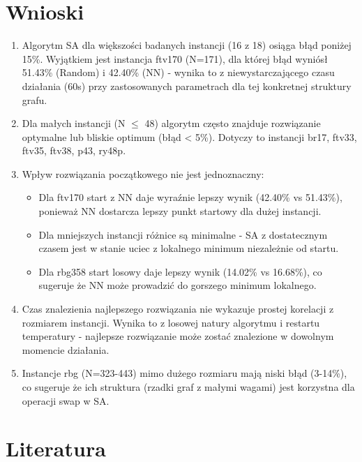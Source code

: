 \documentclass[a4paper,12pt]{article}
\begin{document}
\section{Wnioski}

\begin{enumerate}
    \item Algorytm SA dla większości badanych instancji (16 z 18) osiąga błąd poniżej 15\%. Wyjątkiem jest instancja ftv170 (N=171), dla której błąd wyniósł 51.43\% (Random) i 42.40\% (NN) - wynika to z niewystarczającego czasu działania (60s) przy zastosowanych parametrach dla tej konkretnej struktury grafu.
    
    \item Dla małych instancji (N $\leq$ 48) algorytm często znajduje rozwiązanie optymalne lub bliskie optimum (błąd < 5\%). Dotyczy to instancji br17, ftv33, ftv35, ftv38, p43, ry48p.
    
    \item Wpływ rozwiązania początkowego nie jest jednoznaczny:
    \begin{itemize}
        \item Dla ftv170 start z NN daje wyraźnie lepszy wynik (42.40\% vs 51.43\%), ponieważ NN dostarcza lepszy punkt startowy dla dużej instancji.
        \item Dla mniejszych instancji różnice są minimalne - SA z dostatecznym czasem jest w stanie uciec z lokalnego minimum niezależnie od startu.
        \item Dla rbg358 start losowy daje lepszy wynik (14.02\% vs 16.68\%), co sugeruje że NN może prowadzić do gorszego minimum lokalnego.
    \end{itemize}
    
    \item Czas znalezienia najlepszego rozwiązania nie wykazuje prostej korelacji z rozmiarem instancji. Wynika to z losowej natury algorytmu i restartu temperatury - najlepsze rozwiązanie może zostać znalezione w dowolnym momencie działania.
    
    \item Instancje rbg (N=323-443) mimo dużego rozmiaru mają niski błąd (3-14\%), co sugeruje że ich struktura (rzadki graf z małymi wagami) jest korzystna dla operacji swap w SA.
\end{enumerate}

\section{Literatura}
\end{document}
